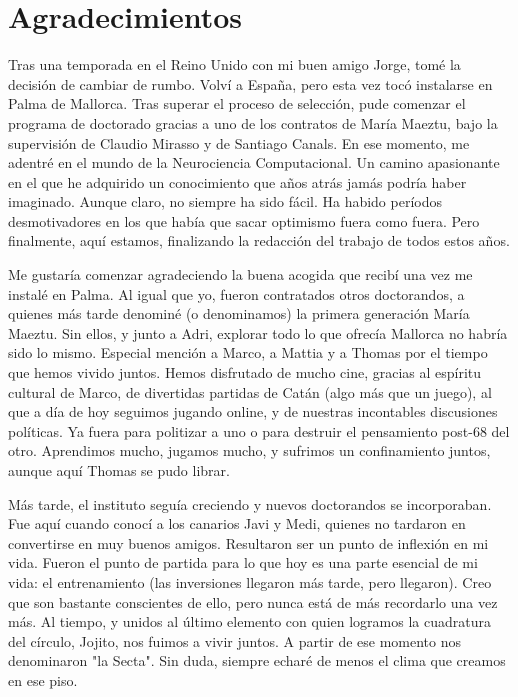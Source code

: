 \documentclass[../main.tex]{subfiles}
\begin{document}
\begingroup
\let\clearpage\relax
\let\cleardoublepage\relax
\let\cleardoublepage\relax
\chapter*{Agradecimientos}
\thispagestyle{empty}
Tras una temporada en el Reino Unido con mi buen amigo Jorge, tomé la decisión de cambiar de rumbo.
Volví a España, pero esta vez tocó instalarse en Palma de Mallorca. Tras superar el proceso de selección, pude comenzar el programa de doctorado gracias a uno de los contratos de María Maeztu, bajo la supervisión de Claudio Mirasso y de Santiago Canals.
En ese momento, me adentré en el mundo de la Neurociencia Computacional.
Un camino apasionante en el que he adquirido un conocimiento que años atrás jamás podría haber imaginado.
Aunque claro, no siempre ha sido fácil.
Ha habido períodos desmotivadores en los que había que sacar optimismo fuera como fuera.
Pero finalmente, aquí estamos, finalizando la redacción del trabajo de todos estos años.

Me gustaría comenzar agradeciendo la buena acogida que recibí una vez me instalé en Palma.
Al igual que yo, fueron contratados otros doctorandos, a quienes más tarde denominé (o denominamos) la primera generación María Maeztu.
Sin ellos, y junto a Adri, explorar todo lo que ofrecía Mallorca no habría sido lo mismo.
Especial mención a Marco, a Mattia y a Thomas por el tiempo que hemos vivido juntos.
Hemos disfrutado de mucho cine, gracias al espíritu cultural de Marco, de divertidas partidas de Catán (algo más que un juego), al que a día de hoy seguimos jugando online, y de nuestras incontables discusiones políticas.
Ya fuera para politizar a uno o para destruir el pensamiento post-68 del otro. Aprendimos mucho, jugamos mucho, y sufrimos un confinamiento juntos, aunque aquí Thomas se pudo librar.

Más tarde, el instituto seguía creciendo y nuevos doctorandos se incorporaban.
Fue aquí cuando conocí a los canarios Javi y Medi, quienes no tardaron en convertirse en muy buenos amigos.
Resultaron ser un punto de inflexión en mi vida.
Fueron el punto de partida para lo que hoy es una parte esencial de mi vida: el entrenamiento (las inversiones llegaron más tarde, pero llegaron).
Creo que son bastante conscientes de ello, pero nunca está de más recordarlo una vez más.
Al tiempo, y unidos al último elemento con quien logramos la cuadratura del círculo, Jojito, nos fuimos a vivir juntos.
A partir de ese momento nos denominaron "la Secta".
Sin duda, siempre echaré de menos el clima que creamos en ese piso.
\end{document}
